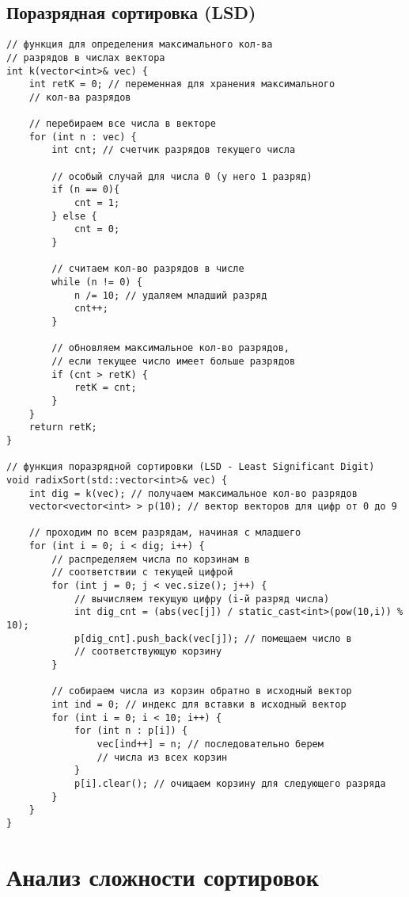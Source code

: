 \documentclass[otchet]{SCWorks}
\begin{document}
\subsection{Поразрядная сортировка (LSD)}
\begin{verbatim}
// функция для определения максимального кол-ва 
// разрядов в числах вектора
int k(vector<int>& vec) {
    int retK = 0; // переменная для хранения максимального 
	// кол-ва разрядов
    
    // перебираем все числа в векторе
    for (int n : vec) {
        int cnt; // счетчик разрядов текущего числа
        
        // особый случай для числа 0 (у него 1 разряд)
        if (n == 0){
            cnt = 1;
        } else {
            cnt = 0;
        }
        
        // считаем кол-во разрядов в числе
        while (n != 0) {
            n /= 10; // удаляем младший разряд
            cnt++;
        }
        
        // обновляем максимальное кол-во разрядов, 
		// если текущее число имеет больше разрядов
        if (cnt > retK) {
            retK = cnt;
        }
    }
    return retK;
}

// функция поразрядной сортировки (LSD - Least Significant Digit)
void radixSort(std::vector<int>& vec) {
    int dig = k(vec); // получаем максимальное кол-во разрядов
    vector<vector<int> > p(10); // вектор векторов для цифр от 0 до 9
    
    // проходим по всем разрядам, начиная с младшего
    for (int i = 0; i < dig; i++) {
        // распределяем числа по корзинам в 
		// соответствии с текущей цифрой
        for (int j = 0; j < vec.size(); j++) {
            // вычисляем текущую цифру (i-й разряд числа)
            int dig_cnt = (abs(vec[j]) / static_cast<int>(pow(10,i)) % 10);
            p[dig_cnt].push_back(vec[j]); // помещаем число в 
			// соответствующую корзину
        }
        
        // собираем числа из корзин обратно в исходный вектор
        int ind = 0; // индекс для вставки в исходный вектор
        for (int i = 0; i < 10; i++) {
            for (int n : p[i]) {
                vec[ind++] = n; // последовательно берем 
				// числа из всех корзин
            }
            p[i].clear(); // очищаем корзину для следующего разряда
        }
    }
}
\end{verbatim}

\section{Анализ сложности сортировок}
\end{document}
